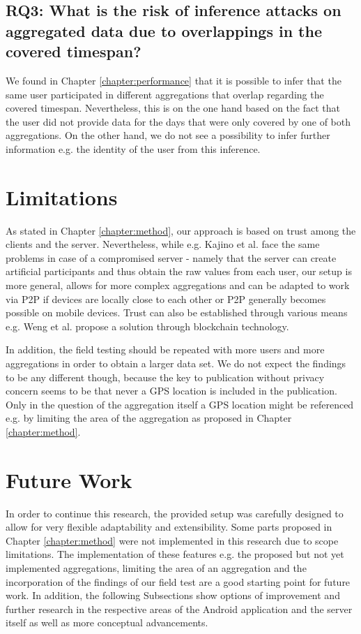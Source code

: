 \subsection*{RQ3: What is the risk of inference attacks on aggregated data due to overlappings in the covered timespan?}
We found in Chapter \ref{chapter:performance} that it is possible to infer that the same user participated in different aggregations that overlap regarding the covered timespan. Nevertheless, this is on the one hand based on the fact that the user did not provide data for the days that were only covered by one of both aggregations. On the other hand, we do not see a possibility to infer further information e.g. the identity of the user from this inference.

\section{Limitations}
As stated in Chapter \ref{chapter:method}, our approach is based on trust among the clients and the server. Nevertheless, while e.g. Kajino et al. \parencite{crowdsourcing} face the same problems in case of a compromised server - namely that the server can create artificial participants and thus obtain the raw values from each user, our setup is more general, allows for more complex aggregations and can be adapted to work via P2P if devices are locally close to each other or P2P generally becomes possible on mobile devices. Trust can also be established through various means e.g. Weng et al. \parencite{li2018crowdbc} propose a solution through blockchain technology.

In addition, the field testing should be repeated with more users and more aggregations in order to obtain a larger data set. We do not expect the findings to be any different though, because the key to publication without privacy concern seems to be that never a GPS location is included in the publication. Only in the question of the aggregation itself a GPS location might be referenced e.g. by limiting the area of the aggregation as proposed in Chapter \ref{chapter:method}.

\section{Future Work}
In order to continue this research, the provided setup was carefully designed to allow for very flexible adaptability and extensibility. Some parts proposed in Chapter \ref{chapter:method} were not implemented in this research due to scope limitations. The implementation of these features e.g. the proposed but not yet implemented aggregations, limiting the area of an aggregation and the incorporation of the findings of our field test are a good starting point for future work. In addition, the following Subsections show options of improvement and further research in the respective areas of the Android application and the server itself as well as more conceptual advancements.

